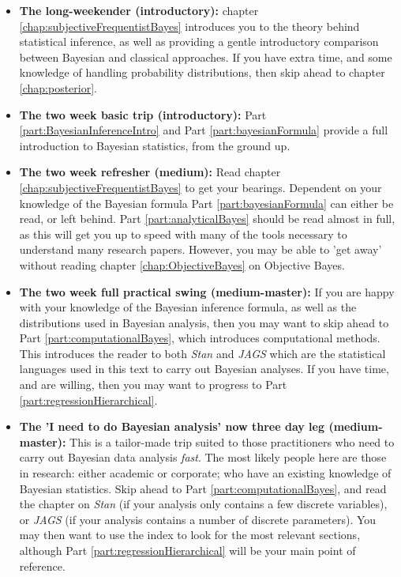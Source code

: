 \documentclass[11pt,fullpage]{book}
\begin{document}
\begin{itemize}
\item \textbf{The long-weekender (introductory):} chapter \ref{chap:subjectiveFrequentistBayes} introduces you to the theory behind statistical inference, as well as providing a gentle introductory comparison between Bayesian and classical approaches. If you have extra time, and some knowledge of handling probability distributions, then skip ahead to chapter \ref{chap:posterior}.
\item \textbf{The two week basic trip (introductory):} Part \ref{part:BayesianInferenceIntro} and Part \ref{part:bayesianFormula} provide a full introduction to Bayesian statistics, from the ground up. 
\item \textbf{The two week refresher (medium):} Read chapter \ref{chap:subjectiveFrequentistBayes} to get your bearings. Dependent on your knowledge of the Bayesian formula Part \ref{part:bayesianFormula} can either be read, or left behind. Part \ref{part:analyticalBayes} should be read almost in full, as this will get you up to speed with many of the tools necessary to understand many research papers. However, you may be able to 'get away' without reading chapter \ref{chap:ObjectiveBayes} on Objective Bayes.
\item \textbf{The two week full practical swing (medium-master):} If you are happy with your knowledge of the Bayesian inference formula, as well as the distributions used in Bayesian analysis, then you may want to skip ahead to Part \ref{part:computationalBayes}, which introduces computational methods. This introduces the reader to both \textit{Stan} and \textit{JAGS} which are the statistical languages used in this text to carry out Bayesian analyses. If you have time, and are willing, then you may want to progress to Part \ref{part:regressionHierarchical}. 
\item \textbf{The 'I need to do Bayesian analysis' now three day leg (medium-master):} This is a tailor-made trip suited to those practitioners who need to carry out Bayesian data analysis \textit{fast}. The most likely people here are those in research: either academic or corporate; who have an existing knowledge of Bayesian statistics. Skip ahead to Part \ref{part:computationalBayes}, and read the chapter on \textit{Stan} (if your analysis only contains a few discrete variables), or \textit{JAGS} (if your analysis contains a number of discrete parameters). You may then want to use the index to look for the most relevant sections, although Part \ref{part:regressionHierarchical} will be your main point of reference.

\end{itemize}
\end{document}
